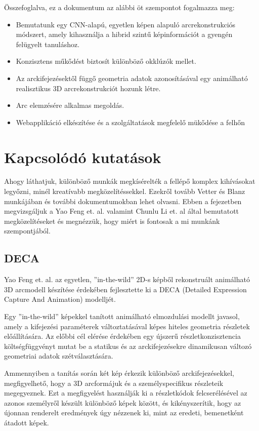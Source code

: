 \documentclass[12pt,a4]{article}
\begin{document}
	 Összefoglalva, ez a dokumentum az alábbi öt szempontot fogalmazza meg:
	 \begin{itemize}
	 	\item Bemutatunk egy CNN-alapú, egyetlen képen alapuló arcrekonstrukciós
	 	módszert, amely kihasználja a hibrid szintű képinformációt a gyengén
	 	felügyelt tanuláshoz.
	 	\item Konzisztens műkődést biztosít különböző okklúzók mellet.
	 	\item Az arckifejezésektől függő geometria adatok azonosításával egy
	 	animálható realisztikus 3D arcrekonstrukciót hozunk létre.
	 	\item Arc elemzésére alkalmas megoldás.
	 	\item Webapplikáció elkészítése és a szolgáltatások megfelelő mükődése a felhőn
	 \end{itemize}
 
 	\section{Kapcsolódó kutatások}
 	
 	Ahogy láthatjuk, különböző munkák megkísérelték a fellépő komplex
 	kihívásokat legyőzni, minél kreatívabb megközelítéssekkel. Ezekről tovább Vetter és Blanz \cite{blanzvetter} munkájában és további dokumentumokban lehet olvasni.
 	Ebben a fejezetben megvizsgáljuk a Yao Feng et. al. \cite{deca} valamint Chunlu
 	Li et. al \cite{focus} által bemutatott megközelítéseket és megnézzük, hogy miért is fontosak a mi munkánk szempontjából.
 	
 	\subsection{DECA}
 	
 	Yao Feng et. al.\cite{deca} az egyetlen, ”in-the-wild” 2D-s képből rekonstruált animálható 3D arcmodell készítése érdekében fejlesztette ki a DECA (Detailed Expression Capture And Animation) modelljét.
 	
 	Egy ”in-the-wild” képekkel tanított animálható elmozdulási modellt javasol, amely a kifejezési paraméterek változtatásával képes hiteles geometria részletek előállítására. Az előbbi cél elérése érdekében egy újszerű részletkonzisztencia költségfüggvényt mutat be a statikus és az arckifejezésekre dinamikusan változó geometriai adatok szétválasztására.
 	
 	Ammennyiben a tanítás során két kép érkezik különböző arckifejezésekkel,
 	megfigyelhető, hogy a 3D arcformájuk és a személyspecifikus részleteik megegyeznek. Ezt a megfigyelést használják ki a részletkódok felcserélésével az
 	azonos személyről készült különböző képek között, és kikényszerítik, hogy az
 	újonnan renderelt eredmények úgy nézzenek ki, mint az eredeti, bemenetként
 	átadott képek.
 	
\end{document}
